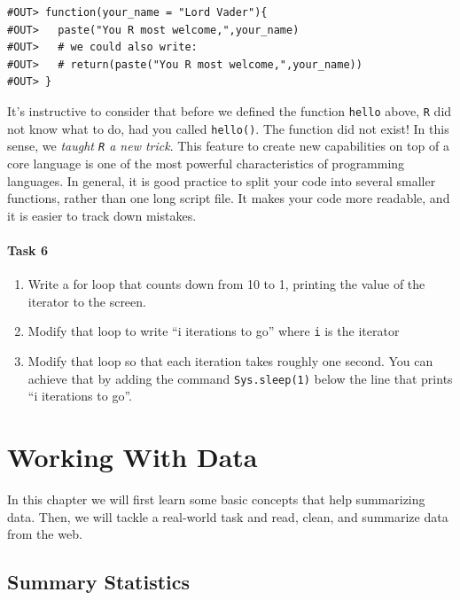 \documentclass[]{book}
\providecommand{\tightlist}{%
  \setlength{\itemsep}{0pt}\setlength{\parskip}{0pt}}
\theoremstyle{definition}
\theoremstyle{definition}
\theoremstyle{definition}
\theoremstyle{remark}
\begin{document}
\begin{verbatim}
#OUT> function(your_name = "Lord Vader"){
#OUT>   paste("You R most welcome,",your_name)
#OUT>   # we could also write:
#OUT>   # return(paste("You R most welcome,",your_name))
#OUT> }
\end{verbatim}

It's instructive to consider that before we defined the function
\texttt{hello} above, \texttt{R} did not know what to do, had you called
\texttt{hello()}. The function did not exist! In this sense, we
\emph{taught \texttt{R} a new trick}. This feature to create new
capabilities on top of a core language is one of the most powerful
characteristics of programming languages. In general, it is good
practice to split your code into several smaller functions, rather than
one long script file. It makes your code more readable, and it is easier
to track down mistakes.

\subsubsection{Task 6}\label{task-6}

\begin{enumerate}
\def\labelenumi{\arabic{enumi}.}
\tightlist
\item
  Write a for loop that counts down from 10 to 1, printing the value of
  the iterator to the screen.
\item
  Modify that loop to write ``i iterations to go'' where \texttt{i} is
  the iterator
\item
  Modify that loop so that each iteration takes roughly one second. You
  can achieve that by adding the command \texttt{Sys.sleep(1)} below the
  line that prints ``i iterations to go''.
\end{enumerate}

\chapter{Working With Data}\label{sum}

In this chapter we will first learn some basic concepts that help
summarizing data. Then, we will tackle a real-world task and read,
clean, and summarize data from the web.

\section{Summary Statistics}\label{summary-statistics}
\end{document}
